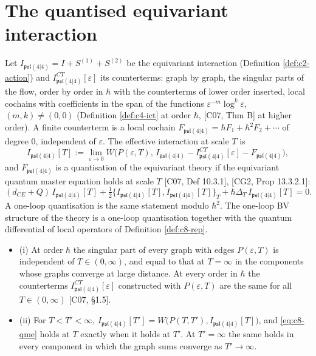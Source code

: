 \section{The quantised equivariant interaction}

\begin{definition}
\label{def:c8-quant}
Let $I_{\mathfrak{psl}(4|4)}=I+S^{(1)}+S^{(2)}$ be the equivariant interaction (Definition \ref{def:c2-action}) and $I^{CT}_{\mathfrak{psl}(4|4)}[\varepsilon]$ its counterterms: graph by graph, the singular parts of the flow, order by order in $\hbar$ with the counterterms of lower order inserted, local cochains with coefficients in the span of the functions $\varepsilon^{-m}\log^k\varepsilon$, $(m,k)\neq(0,0)$ (Definition \ref{def:c4-ict} at order $\hbar$, [C07, Thm B] at higher order). A finite counterterm is a local cochain $F_{\mathfrak{psl}(4|4)}=\hbar F_1+\hbar^2F_2+\cdots$ of degree $0$, independent of $\varepsilon$. The effective interaction at scale $T$ is
\begin{equation}
I_{\mathfrak{psl}(4|4)}[T]:=\lim_{\varepsilon\to0}W\big(P(\varepsilon,T),\,I_{\mathfrak{psl}(4|4)}-I^{CT}_{\mathfrak{psl}(4|4)}[\varepsilon]-F_{\mathfrak{psl}(4|4)}\big),
\label{eq:c8-IT}
\end{equation}
and $F_{\mathfrak{psl}(4|4)}$ is a quantisation of the equivariant theory if the equivariant quantum master equation holds at scale $T$ [C07, Def 10.3.1], [CG2, Prop 13.3.2.1]:
\begin{equation}
(d_{CE}+Q)\,I_{\mathfrak{psl}(4|4)}[T]+\tfrac12\big\{I_{\mathfrak{psl}(4|4)}[T],I_{\mathfrak{psl}(4|4)}[T]\big\}_T+\hbar\Delta_T\,I_{\mathfrak{psl}(4|4)}[T]=0 .
\label{eq:c8-qme}
\end{equation}
A one-loop quantisation is the same statement modulo $\hbar^2$. The one-loop BV structure of the theory is a one-loop quantisation together with the quantum differential of local operators of Definition \ref{def:c8-rep}.
\end{definition}

\begin{proposition}
\label{prop:c8-Tindep}
\begin{itemize}
\item (i) At order $\hbar$ the singular part of every graph with edges $P(\varepsilon,T)$ is independent of $T\in(0,\infty)$, and equal to that at $T=\infty$ in the components whose graphs converge at large distance. At every order in $\hbar$ the counterterms $I^{CT}_{\mathfrak{psl}(4|4)}[\varepsilon]$ constructed with $P(\varepsilon,T)$ are the same for all $T\in(0,\infty)$ [C07, §1.5].
\item (ii) For $T<T'<\infty$, $I_{\mathfrak{psl}(4|4)}[T']=W\big(P(T,T'),I_{\mathfrak{psl}(4|4)}[T]\big)$, and \eqref{eq:c8-qme} holds at $T$ exactly when it holds at $T'$. At $T'=\infty$ the same holds in every component in which the graph sums converge as $T'\to\infty$.
\end{itemize}
\end{proposition}

